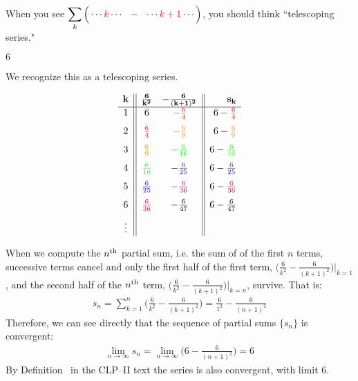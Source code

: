 \begin{hint}
When you see $\displaystyle\sum_k \Big(\cdots \textcolor{red}{k}\cdots \ \ -\ \ \cdots \textcolor{red}{k+1}\cdots\Big)$,
you should  think ``telescoping series."
\end{hint}

\begin{answer}
$6$
\end{answer}

\begin{solution}
We recognize this as a telescoping series.

\[\begin{array}{c||cc||r}
\mathbf{k}&\mathbf{\frac{6}{k^2}}&\mathbf{-\frac{6}{(k+1)^2}}&\mathbf{s_k}\\
\hline
1&6&\color{red}-\frac{6}{4}&6-\color{red}\frac64\\[7pt]
2&\color{red}\frac{6}{4}&\color{orange}-\frac{6}{9}&6-\color{orange}\frac69\\[7pt]
3&\color{orange}\frac{6}{9}&\color{green}-\frac{6}{16}&6-\color{green}\frac{6}{16}\\[7pt]
4&\color{green}\frac{6}{16}&\color{blue}-\frac{6}{25}&6-\color{blue}\frac{6}{25}\\[7pt]
5&\color{blue}\frac{6}{25}&\color{purple}-\frac{6}{36}&6-\color{purple}\frac{6}{36}\\[7pt]
6&\color{purple}\frac{6}{36}&-\frac{6}{47}&6-\frac{6}{47}\\[7pt]
\vdots&&&
\end{array}\]

When we compute  the $n^{\rm th}$
partial sum, i.e. the sum of of the first $n$ terms, successive terms cancel and only
the first half of the first term, $\Big( \frac{6}{k^2} - \frac{6}{(k+1)^2} \Big)\Big|_{k=1}$,
and the second half of the $n^{\rm th}$ term,
$\Big( \frac{6}{k^2} - \frac{6}{(k+1)^2} \Big)\Big|_{k=n}$, survive. That is:
\begin{align*}
s_n = \sum_{k=1}^{n} \bigg( \frac{6}{k^2} - \frac{6}{(k+1)^2} \bigg)
      = \frac6{1^2} - \frac{6}{(n+1)^2}
\end{align*}
Therefore, we can see directly that the sequence of partial sums $\{ s_n \}$ is convergent:
\begin{align*}
\lim_{n\to\infty} s_n = \lim_{n\to\infty}  \bigg( 6- \frac{6}{(n+1)^2} \bigg) = 6
\end{align*}
By Definition~ in the CLP--II text the series is also convergent, with limit $6$.

\end{solution}

